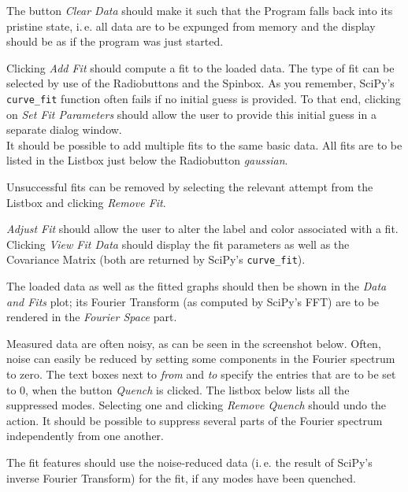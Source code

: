 \documentclass[
	english,
	fontsize=10pt,
	parskip=half,
	titlepage=true,
	DIV=12
]{scrartcl}
\newcommand*{\ie}{i.\,e.\xspace}
\begin{document}
The button \emph{Clear Data} should make it such that the Program falls back into its pristine state, \ie all data are to be expunged from memory and the display should be as if the program was just started.

Clicking \emph{Add Fit} should compute a fit to the loaded data. The type of fit can be selected by use of the Radiobuttons and the Spinbox. As you remember, SciPy's \texttt{curve\_fit} function often fails if no initial guess is provided. To that end, clicking on \emph{Set Fit Parameters} should allow the user to provide this initial guess in a separate dialog window.\\
It should be possible to add multiple fits to the same basic data. All fits are to be listed in the Listbox just below the Radiobutton \emph{gaussian}.

Unsuccessful fits can be removed by selecting the relevant attempt from the Listbox and clicking \emph{Remove Fit}.

\emph{Adjust Fit} should allow the user to alter the label and color associated with a fit. Clicking \emph{View Fit Data} should display the fit parameters as well as the Covariance Matrix (both are returned by SciPy's \texttt{curve\_fit}).

The loaded data as well as the fitted graphs should then be shown in the \emph{Data and Fits} plot; its Fourier Transform (as computed by SciPy's FFT) are to be rendered in the \emph{Fourier Space} part.

Measured data are often noisy, as can be seen in the screenshot below. Often, noise can easily be reduced by setting some components in the Fourier spectrum to zero. The text boxes next to \emph{from} and \emph{to} specify the entries that are to be set to 0, when the button \emph{Quench} is clicked. The listbox below lists all the suppressed modes. Selecting one and clicking \emph{Remove Quench} should undo the action. It should be possible to suppress several parts of the Fourier spectrum independently from one another.

The fit features should use the noise-reduced data (\ie the result of SciPy's inverse Fourier Transform) for the fit, if any modes have been quenched.
\end{document}
